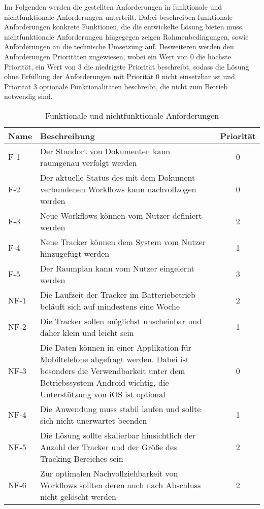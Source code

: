 Im Folgenden werden die gestellten Anforderungen in funktionale und nichtfunktionale Anforderungen
unterteilt. 
Dabei beschreiben funktionale Anforderungen konkrete Funktionen, die die entwickelte Lösung bieten
muss, nichtfunktionale Anforderungen hingegegen zeigen Rahmenbedingungen, sowie Anforderungen an die
technische Umsetzung auf.
Desweiteren werden den Anforderungen Prioritäten zugewiesen, wobei ein Wert von 0 die höchste
Priorität, ein Wert von 3 die niedrigste Priorität beschreibt, sodass die Lösung ohne Erfüllung der
Anforderungen mit Priorität 0 nicht einsetzbar ist und Priorität 3 optionale Funktionalitäten
beschreibt, die nicht zum Betrieb notwendig sind. 
\begin{table}[htbp]
  \renewcommand{\arraystretch}{1.5}
\centering
\begin{tabularx}{0.9\textwidth}{lXc}
  \textbf{Name} & \textbf{Beschreibung} & \textbf{Priorität} \\
  \hline 
  F-1 \label{fa:tracking} & Der Standort von Dokumenten kann raumgenau verfolgt werden & 0 \\
  F-2 \label{fa:workflow} & Der aktuelle Status des mit dem Dokument verbundenen Workflows kann
  nachvollzogen werden & 0 \\
  F-3 \label{fa:neue-workflows} & Neue Workflows können vom Nutzer definiert werden & 2 \\
  F-4 \label{fa:neue-tracker} & Neue Tracker können dem System vom Nutzer hinzugefügt werden & 1 \\
  F-5 \label{fa:raumplan} & Der Raumplan kann vom Nutzer eingelernt werden & 3 \\
  \midrule
  NF-1 \label{nf:akku} & Die Laufzeit der Tracker im Batteriebetrieb beläuft sich auf mindestens
  eine Woche & 2 \\
  NF-2 \label{nf:klein} & Die Tracker sollen möglichst unscheinbar und daher klein und leicht sein
  & 1 \\
  NF-3 \label{nf:app} & Die Daten können in einer Applikation für Mobiltelefone abgefragt werden.
  Dabei ist besonders die Verwendbarkeit unter dem Betriebssystem Android wichtig, die Unterstützung
 von iOS ist optional & 0 \\
  NF-4 \label{nf:stabilität} & Die Anwendung muss stabil laufen und sollte sich nicht unerwartet
  beenden & 1 \\
  NF-5 \label{nf:skalierbarkeit} & Die Lösung sollte skalierbar hinsichtlich der Anzahl der Tracker
  und der Größe des Tracking-Bereiches sein & 2 \\
  NF-6 \label{nf:nachvollziehbarkeit} & Zur optimalen Nachvollziehbarkeit von Workflows sollten deren auch
  nach Abschluss nicht gelöscht werden & 2 \\
\end{tabularx}
\caption{Funktionale und nichtfunktionale Anforderungen}
\label{tab:anforderungen}
\end{table}
